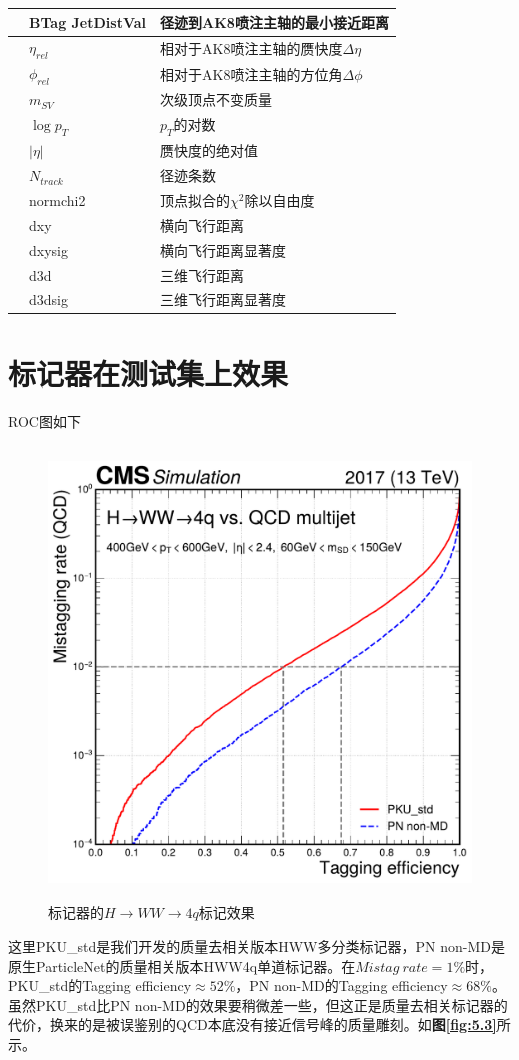 \begin{table}[htbp]
\begin{tabular}{>{\centering\arraybackslash}p{2.5cm}%
    >{\centering\arraybackslash}p{3cm}%
    >{\centering\arraybackslash}p{9cm}}
    & BTag JetDistVal & 径迹到AK8喷注主轴的最小接近距离\\
    \midrule
    \multirow{11}{*}{次级顶点} & $\eta_{rel}$ & 相对于AK8喷注主轴的赝快度$\Delta \eta$\\
    & $\phi_{rel}$ & 相对于AK8喷注主轴的方位角$\Delta \phi$\\
    & $m_{SV}$ & 次级顶点不变质量\\
    & $\log{p_T}$ & $p_T$的对数\\
    & $|\eta|$ & 赝快度的绝对值\\
    & $N_{track}$ & 径迹条数\\
    & normchi2 & 顶点拟合的$\chi^2$除以自由度\\
    & dxy & 横向飞行距离\\
    & dxysig & 横向飞行距离显著度\\
    & d3d & 三维飞行距离\\
    & d3dsig & 三维飞行距离显著度\\
    \bottomrule\bottomrule
\end{tabular}
\end{table}

\section{标记器在测试集上效果}
ROC图如下
\begin{figure}[H]\label{fig:5.2}
 \centering
 \caption{标记器的$H\to WW\to 4q$标记效果}
 \includegraphics[height=12cm, width=12cm]{pictures/ROC_HWW_4q.pdf}
\end{figure}
这里PKU\_std是我们开发的质量去相关版本HWW多分类标记器，PN non-MD是原生ParticleNet的质量相关版本HWW4q单道标记器。在$Mistag\ rate=1\%$时，PKU\_std的Tagging efficiency$\approx52\%$，PN non-MD的Tagging efficiency$\approx68\%$。虽然PKU\_std比PN non-MD的效果要稍微差一些，但这正是质量去相关标记器的代价，换来的是被误鉴别的QCD本底没有接近信号峰的质量雕刻。如\textbf{图\ref{fig:5.3}}所示。

